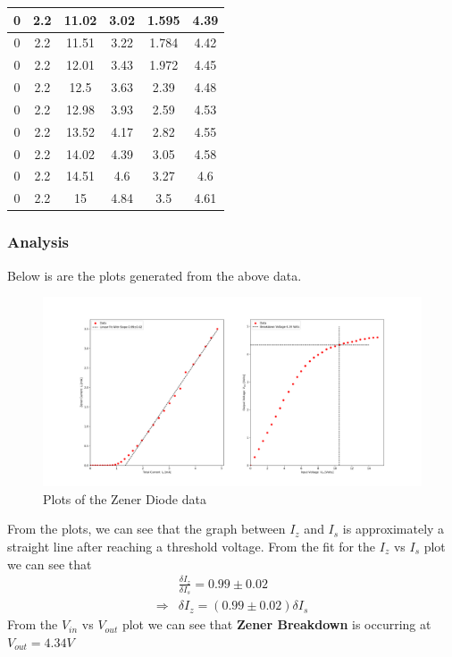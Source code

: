 \documentclass[10pt]{scrartcl}
\theoremstyle{definition}
\begin{document}
\begin{table}[!ht]
\begin{tabular}{|c|c|c|c|c|c|}
        0 & 2.2 & 11.02 & 3.02 & 1.595 & 4.39 \\ \hline
        0 & 2.2 & 11.51 & 3.22 & 1.784 & 4.42 \\ \hline
        0 & 2.2 & 12.01 & 3.43 & 1.972 & 4.45 \\ \hline
        0 & 2.2 & 12.5 & 3.63 & 2.39 & 4.48 \\ \hline
        0 & 2.2 & 12.98 & 3.93 & 2.59 & 4.53 \\ \hline
        0 & 2.2 & 13.52 & 4.17 & 2.82 & 4.55 \\ \hline
        0 & 2.2 & 14.02 & 4.39 & 3.05 & 4.58 \\ \hline
        0 & 2.2 & 14.51 & 4.6 & 3.27 & 4.6 \\ \hline
        0 & 2.2 & 15 & 4.84 & 3.5 & 4.61 \\ \hline
    \end{tabular}
\end{table}
\clearpage
\subsubsection{Analysis}
Below is are the plots generated from the above data.

\begin{figure}[h]
    \centering
    \includegraphics[width=\linewidth]{linereg.png}
    \caption{Plots of the Zener Diode data}
\end{figure}
From the plots, we can see that the graph between $I_z$ and $I_s$ is approximately a straight line
after reaching a threshold voltage. From the fit for the $I_z$ vs $I_s$ plot we can see that
\begin{align*}
    &\frac{\delta{I_z}}{\delta{I_s}} = 0.99 \pm 0.02 \\ 
    \Rightarrow &\boxed{\delta{I_z} = (0.99 \pm 0.02)\delta{I_s}}
\end{align*}
From the $V_{in}$ vs $V_{out}$ plot we can see that \textbf{Zener Breakdown} is occurring at $\boxed{V_{out} = 4.34 V}$
\end{document}
